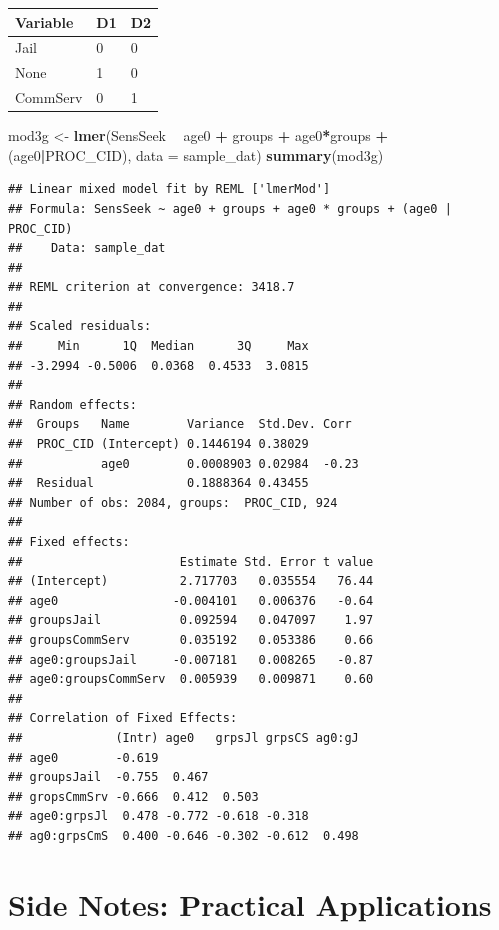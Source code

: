 \documentclass[]{article}
\newenvironment{Shaded}{\begin{snugshade}}{\end{snugshade}}
\newcommand{\KeywordTok}[1]{\textcolor[rgb]{0.13,0.29,0.53}{\textbf{#1}}}
\newcommand{\DataTypeTok}[1]{\textcolor[rgb]{0.13,0.29,0.53}{#1}}
\newcommand{\StringTok}[1]{\textcolor[rgb]{0.31,0.60,0.02}{#1}}
\newcommand{\OperatorTok}[1]{\textcolor[rgb]{0.81,0.36,0.00}{\textbf{#1}}}
\newcommand{\NormalTok}[1]{#1}
\begin{document}
\begin{longtable}[]{@{}lll@{}}
\toprule
Variable & D1 & D2\tabularnewline
\midrule
\endhead
Jail & 0 & 0\tabularnewline
None & 1 & 0\tabularnewline
CommServ & 0 & 1\tabularnewline
\bottomrule
\end{longtable}

\small

\begin{Shaded}
\begin{Highlighting}[]
\NormalTok{mod3g <-}\StringTok{ }\KeywordTok{lmer}\NormalTok{(SensSeek }\OperatorTok{~}\StringTok{ }\NormalTok{age0 }\OperatorTok{+}\StringTok{ }\NormalTok{groups }\OperatorTok{+}\StringTok{ }\NormalTok{age0}\OperatorTok{*}\NormalTok{groups }\OperatorTok{+}\StringTok{ }
\StringTok{                }\NormalTok{(age0}\OperatorTok{|}\NormalTok{PROC_CID), }\DataTypeTok{data =}\NormalTok{ sample_dat)}
\KeywordTok{summary}\NormalTok{(mod3g)}
\end{Highlighting}
\end{Shaded}

\begin{verbatim}
## Linear mixed model fit by REML ['lmerMod']
## Formula: SensSeek ~ age0 + groups + age0 * groups + (age0 | PROC_CID)
##    Data: sample_dat
## 
## REML criterion at convergence: 3418.7
## 
## Scaled residuals: 
##     Min      1Q  Median      3Q     Max 
## -3.2994 -0.5006  0.0368  0.4533  3.0815 
## 
## Random effects:
##  Groups   Name        Variance  Std.Dev. Corr 
##  PROC_CID (Intercept) 0.1446194 0.38029       
##           age0        0.0008903 0.02984  -0.23
##  Residual             0.1888364 0.43455       
## Number of obs: 2084, groups:  PROC_CID, 924
## 
## Fixed effects:
##                      Estimate Std. Error t value
## (Intercept)          2.717703   0.035554   76.44
## age0                -0.004101   0.006376   -0.64
## groupsJail           0.092594   0.047097    1.97
## groupsCommServ       0.035192   0.053386    0.66
## age0:groupsJail     -0.007181   0.008265   -0.87
## age0:groupsCommServ  0.005939   0.009871    0.60
## 
## Correlation of Fixed Effects:
##             (Intr) age0   grpsJl grpsCS ag0:gJ
## age0        -0.619                            
## groupsJail  -0.755  0.467                     
## gropsCmmSrv -0.666  0.412  0.503              
## age0:grpsJl  0.478 -0.772 -0.618 -0.318       
## ag0:grpsCmS  0.400 -0.646 -0.302 -0.612  0.498
\end{verbatim}

\normalsize

\section{Side Notes: Practical
Applications}\label{side-notes-practical-applications}
\end{document}
